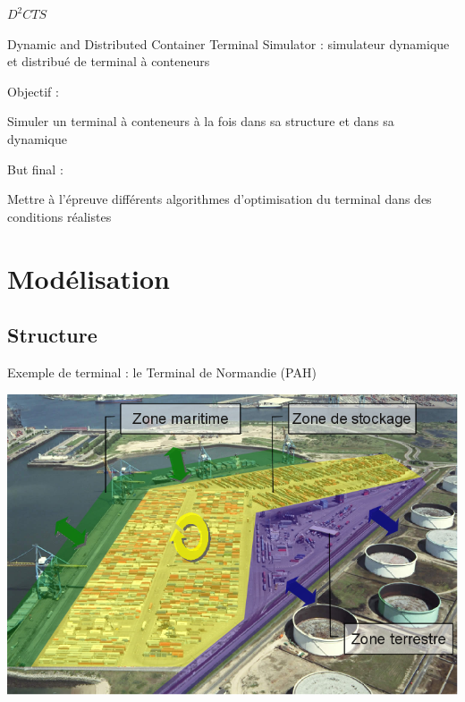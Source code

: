 \documentclass{beamer}
\begin{document}
\begin{frame}{$D^2CTS$}

  Dynamic and Distributed Container Terminal Simulator : simulateur dynamique et distribué de terminal à conteneurs
  \begin{block}{Objectif : }
   	\begin{minipage}[]{\columnwidth}
		Simuler un terminal à conteneurs à la fois dans sa structure et dans sa dynamique
	\end{minipage}
  \end{block}
  \begin{block}{But final : }
   	\begin{minipage}[]{\columnwidth}
		Mettre à l'épreuve différents algorithmes d'optimisation du terminal dans des conditions réalistes
	\end{minipage}
  \end{block}
\end{frame}

\section{Modélisation}
  \subsection{Structure}
 \begin{frame}{Exemple de terminal : le Terminal de Normandie (PAH)}
   \begin{center}
	\includegraphics[height=.60\textheight]{fig/3zonesDuTN.png}
  \end{center}   
 \end{frame}
\end{document}
